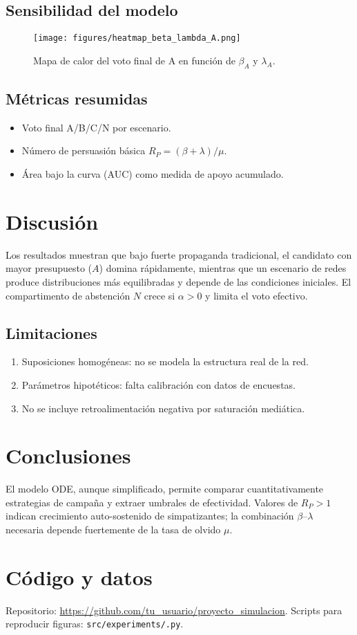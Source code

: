 \documentclass[12pt,a4paper]{article}
\begin{document}
\subsection{Sensibilidad del modelo}
\begin{figure}[ht]
   \centering
   \texttt{[image: figures/heatmap\_beta\_lambda\_A.png]}
   \caption{Mapa de calor del voto final de A en función de $\beta_A$ y $\lambda_A$.}
\end{figure}

\subsection{Métricas resumidas}
\begin{itemize}
  \item Voto final A/B/C/N por escenario.
  \item Número de persuasión básica $R_P = (\beta+\lambda)/\mu$.
  \item Área bajo la curva (AUC) como medida de apoyo acumulado.
\end{itemize}

\section{Discusión}
Los resultados muestran que bajo fuerte propaganda tradicional, el candidato con mayor presupuesto ($A$) domina rápidamente, mientras que un escenario de redes produce distribuciones más equilibradas y depende de las condiciones iniciales.
El compartimento de abstención $N$ crece si $\alpha>0$ y limita el voto efectivo.

\subsection*{Limitaciones}
\begin{enumerate}
  \item Suposiciones homogéneas: no se modela la estructura real de la red.
  \item Parámetros hipotéticos: falta calibración con datos de encuestas.
  \item No se incluye retroalimentación negativa por saturación mediática.
\end{enumerate}

\section{Conclusiones}
El modelo ODE, aunque simplificado, permite comparar cuantitativamente estrategias de campaña y extraer umbrales de efectividad.
Valores de $R_P>1$ indican crecimiento auto-sostenido de simpatizantes; la combinación $\beta$–$\lambda$ necesaria depende fuertemente de la tasa de olvido $\mu$.

\section*{Código y datos}
Repositorio: \url{https://github.com/tu_usuario/proyecto_simulacion}.
Scripts para reproducir figuras: \texttt{src/experiments/\*.py}.
\end{document}
